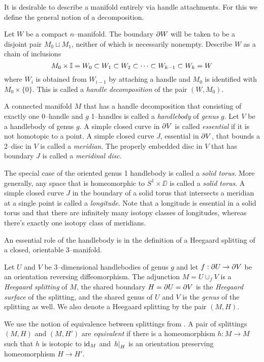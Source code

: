 It is desirable to describe a manifold entirely via handle attachments.
For this we define the general notion of a decomposition.

\begin{defn}
	\label{def:morsehandle}
	Let $W$ be a compact $n$--manifold.
	The boundary $\partial W$ will be taken to be a disjoint pair $M_0\sqcup M_1$, neither of which is necessarily nonempty.
	Describe $W$ as a chain of inclusions
	\[
	M_0 \times\mathbb{I} = W_0 \subset W_1 \subset W_2 \subset \cdots \subset W_{k-1} \subset W_k = W
	\]
	where $W_i$ is obtained from $W_{i-1}$ by attaching a handle and $M_0$ is identified with $M_0\times \{0\}$.
	This is called a \emph{handle decomposition} of the pair $(W,M_0)$.
\end{defn}

\begin{defn}
	A connected manifold $M$ that has a handle decomposition that consisting of exactly one 0--handle and $g$ 1--handles is called a \emph{handlebody} of \emph{genus} $g$.
	Let $V$ be a handlebody of genus $g$.
	A simple closed curve in $\partial V$ is called \emph{essential} if it is not homotopic to a point.
	A simple closed curve $J$, essential in $\partial V$, that bounds a 2--disc in $V$ is called a \emph{meridian}.
	The properly embedded disc in $V$ that has boundary $J$ is called a \emph{meridinal disc}.
	
	The special case of the oriented genus 1 handlebody is called a \emph{solid torus}.
	More generally, any space that is homeomorphic to $S^1\times\DD$ is called a \emph{solid torus}.
	A simple closed curve $J$ in the boundary of a solid torus that intersects a meridian at a single point is called a \emph{longitude}.
	Note that a longitude is essential in a solid torus and that there are infinitely many isotopy classes of longitudes, whereas there's exactly one isotopy class of meridians.
\end{defn}

An essential role of the handlebody is in the definition of a Heegaard splitting of a closed, orientable 3--manifold.

\begin{defn}	
	Let $U$ and $V$ be 3--dimensional handlebodies of genus $g$ and let $f:\partial U\to \partial V$ be an orientation reversing diffeomorphism.
	The adjunction $M=U\cup_f V$ is a \emph{Heegaard splitting} of $M$, the shared boundary $H = \partial U = \partial V$ is the \emph{Heegaard surface} of the splitting, and the shared genus of $U$ and $V$ is the \emph{genus} of the splitting as well.
	We also denote a Heegaard splitting by the pair $(M,H)$.
	
	We use the notion of equivalence between splittings from \cite{SchlWald}.
	A pair of splittings $(M,H)$ and $(M,H')$ are \emph{equivalent} if there is a homeomorphism $h:M\to M$ such that $h$ is isotopic to $\textrm{id}_{M}$ and $\left.h\right|_{H}$ is an orientation preserving homeomorphism $H\to H'$.
\end{defn}

